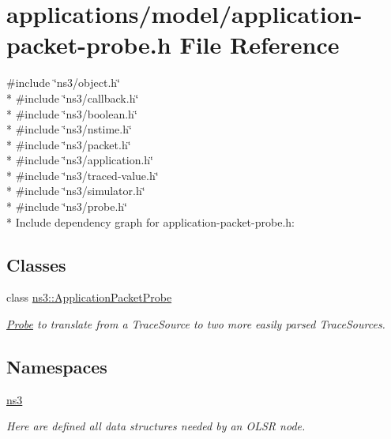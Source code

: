 \hypertarget{application-packet-probe_8h}{}\section{applications/model/application-\/packet-\/probe.h File Reference}
\label{application-packet-probe_8h}
{\ttfamily \#include \char`\"{}ns3/object.\+h\char`\"{}}\\*
{\ttfamily \#include \char`\"{}ns3/callback.\+h\char`\"{}}\\*
{\ttfamily \#include \char`\"{}ns3/boolean.\+h\char`\"{}}\\*
{\ttfamily \#include \char`\"{}ns3/nstime.\+h\char`\"{}}\\*
{\ttfamily \#include \char`\"{}ns3/packet.\+h\char`\"{}}\\*
{\ttfamily \#include \char`\"{}ns3/application.\+h\char`\"{}}\\*
{\ttfamily \#include \char`\"{}ns3/traced-\/value.\+h\char`\"{}}\\*
{\ttfamily \#include \char`\"{}ns3/simulator.\+h\char`\"{}}\\*
{\ttfamily \#include \char`\"{}ns3/probe.\+h\char`\"{}}\\*
Include dependency graph for application-\/packet-\/probe.h\+:
\subsection*{Classes}
\begin{DoxyCompactItemize}
\item 
class \hyperlink{classns3_1_1ApplicationPacketProbe}{ns3\+::\+Application\+Packet\+Probe}
\begin{DoxyCompactList}\small\item\em \hyperlink{classns3_1_1Probe}{Probe} to translate from a Trace\+Source to two more easily parsed Trace\+Sources. \end{DoxyCompactList}\end{DoxyCompactItemize}
\subsection*{Namespaces}
\begin{DoxyCompactItemize}
\item 
 \hyperlink{namespacens3}{ns3}
\begin{DoxyCompactList}\small\item\em Here are defined all data structures needed by an O\+L\+SR node. \end{DoxyCompactList}\end{DoxyCompactItemize}
